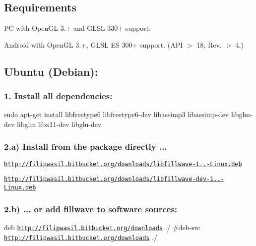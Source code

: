 \subsection*{{\bfseries Requirements}}


\begin{DoxyItemize}
\item P\+C with Open\+G\+L 3.+ and G\+L\+S\+L 330+ support.
\item Android with Open\+G\+L 3.+, G\+L\+S\+L E\+S 300+ support. (A\+P\+I $>$ 18, Rev. $>$ 4.)
\end{DoxyItemize}

\subsection*{{\bfseries Ubuntu (Debian)\+:}}

\subsubsection*{1. Install all dependencies\+:}


\begin{DoxyPre}
{\ttfamily 
sudo apt-get install libfreetype6 libfreetype6-dev libassimp3 libassimp-dev libglm-dev libglm libx11-dev libglu-dev
}
\end{DoxyPre}


\subsubsection*{2.\+a) Install from the package directly ...}


\begin{DoxyItemize}
\item \href{http://filipwasil.bitbucket.org/downloads/libfillwave-1.9.7-Linux.deb}{\tt http\+://filipwasil.\+bitbucket.\+org/downloads/libfillwave-\/1..-\/\+Linux.\+deb}
\item \href{http://filipwasil.bitbucket.org/downloads/libfillwave-dev-1.9.7-Linux.deb}{\tt http\+://filipwasil.\+bitbucket.\+org/downloads/libfillwave-\/dev-\/1..-\/\+Linux.\+deb}
\end{DoxyItemize}

\subsubsection*{2.\+b) ... or add fillwave to software sources\+:}


\begin{DoxyPre}
{\ttfamily 
deb \href{http://filipwasil.bitbucket.org/downloads}{\tt http://filipwasil.bitbucket.org/downloads} ./
#deb-src \href{http://filipwasil.bitbucket.org/downloads}{\tt http://filipwasil.bitbucket.org/downloads} ./
}
\end{DoxyPre}


